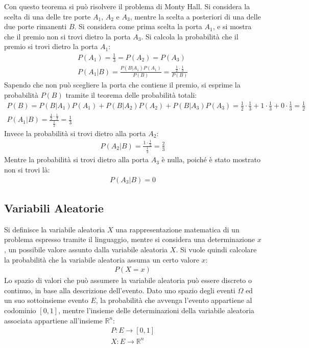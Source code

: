 \documentclass{article}
\numberwithin{equation}{subsection}
\begin{document}
Con questo teorema si può risolvere il problema di Monty Hall. Si considera la scelta di una delle tre porte $A_1$, $A_2$ e $A_3$, mentre la scelta a posteriori di una delle 
due porte rimanenti $B$. Si considera come prima scelta la porta $A_1$, e si mostra che il premio non si trovi dietro la porta $A_3$. Si calcola la probabilità che il premio 
si trovi dietro la porta $A_1$: 
\begin{gather*}
    P(A_1)=\displaystyle\frac{1}{3}=P(A_2)=P(A_3)\\
    P(A_1|B)=\displaystyle\frac{P(B|A_1)P(A_1)}{P(B)}=\frac{\displaystyle\frac{1}{2}\cdot{\frac{1}{3}}}{P(B)}
\end{gather*}
Sapendo che non può scegliere la porta che contiene il premio, si esprime la probabilità $P(B)$ tramite il teorema delle probabilità totali:
\begin{gather*}
    P(B)=P(B|A_1)P(A_1)+P(B|A_2)P(A_2)+P(B|A_3)P(A_3)=\displaystyle\frac{1}{2}\cdot\frac{1}{3}+1\cdot\frac{1}{3}+0\cdot\frac{1}{3}=\frac{1}{2}\\
    P(A_1|B)=\frac{\displaystyle\frac{1}{2}\cdot{\frac{1}{3}}}{\displaystyle\frac{1}{2}}=\frac{1}{3}
\end{gather*}
Invece la probabilità si trovi dietro alla porta $A_2$:
\begin{gather*}
    P(A_2|B)=\displaystyle\frac{1\cdot\displaystyle\frac{1}{3}}{\displaystyle\frac{1}{2}}=\frac{2}{3}
\end{gather*}
Mentre la probabilità si trovi dietro alla porta $A_3$ è nulla, poiché è stato mostrato non si trovi là:
\begin{gather*}
    P(A_3|B)=0
\end{gather*}

\subsection{Variabili Aleatorie}

Si definisce la variabile aleatoria $X$ una rappresentazione matematica di un problema espresso tramite il linguaggio, mentre si considera una determinazione $x$, un possibile 
valore assunto dalla variabile aleatoria $X$. Si vuole quindi calcolare la probabilità che la variabile aleatoria assuma un certo valore $x$:
\begin{gather*}
    P(X=x)
\end{gather*}
Lo spazio di valori che può assumere la variabile aleatoria può essere discreto o continuo, in base alla descrizione dell'evento. Dato uno spazio degli eventi $\Omega$ ed 
un suo sottoinsieme evento $E$, la probabilità che avvenga l'evento appartiene al codominio $[0,1]$, mentre l'insieme delle determinazioni della variabile aleatoria 
associata appartiene all'insieme $\mathbb{R}^n$:
\begin{gather*}
    P: E\to[0,1]\\
    X:E\to\mathbb{R}^n
\end{gather*}
\end{document}
